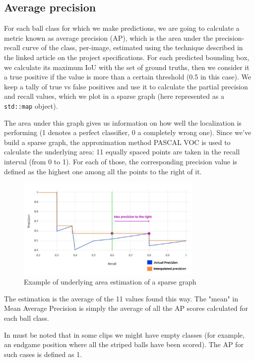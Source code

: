 \subsection{Average precision}

For each ball class for which we make predictions, we are going to 
calculate a metric known as average precision (AP), which is the 
area under the precision-recall curve of the class, per-image, estimated 
using the technique described in the linked article on the project specifications.
For each predicted bounding box, we calculate its maximum IoU with the 
set of ground truths, then we consider it a true positive if the 
value is more than a certain threshold (0.5 in this case). 
We keep a tally of true vs false positives and use it to calculate 
the partial precision and recall values, which we plot in a sparse 
graph (here represented as a \verb|std::map| object).

The area under this graph gives us information on how well the 
localization is performing (1 denotes a perfect classifier, 0 a 
completely wrong one). Since we've build a sparse graph, the 
approximation method PASCAL VOC is used to calculate the 
underlying area: 11 equally spaced points are taken in the 
recall interval (from 0 to 1). For each of those, the corresponding 
precision value is defined as the highest one among all the 
points to the right of it.

\begin{figure}[h]
    \centering
    \includegraphics[width=0.8\textwidth]{./imgs/average_precision_graph.jpg}
    \caption{Example of underlying area estimation of a sparse graph}
\end{figure}

The estimation is the average of the 11 values found this way. The "mean" 
in Mean Average Precision is simply the average of all the AP scores 
calculated for each ball class.

In must be noted that in some clips we might have empty classes (for example, an 
endgame position where all the striped balls have been scored). The 
AP for such cases is defined as 1.